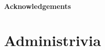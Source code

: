 \documentclass[12pt,a4paper]{article}
\newcommand{\iscolor}{1}     %
\newcommand{\istwosided}{0}  %
\begin{document}
%
\renewcommand{\thepage}{} %
%
\begin{latexonly}
  
\end{latexonly}
\begin{htmlonly}
  
\end{htmlonly}
%
%
\begin{latexonly}
\cleardoublepage
\vspace*{3cm}
\begin{center}{\large \bf Acknowledgements}\end{center}\par

\end{latexonly}
%
\cleardoublepage
\pagestyle{fancy}
\fancyhead{} %
\fancyfoot{} %
\latex{\ifthenelse{\equal{\istwosided}{1}}{}{}}
%
%
\setcounter{page}{1}
\renewcommand{\thepage}{\roman{page}} %
\tableofcontents
\listoffigures
\cleardoublepage
%
%
%
\renewcommand{\thepage}{\arabic{page}} %
\setcounter{page}{1}                   %
\pagestyle{fancy}                      %
%
%
\section{Administrivia}\label{admin}
\end{document}
